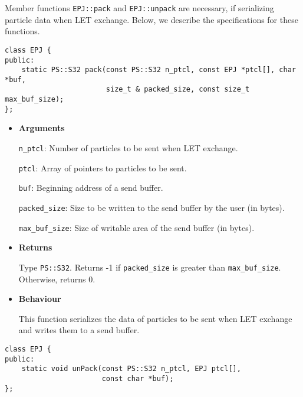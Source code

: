 \label{sec:EPJ:serialize}

Member functions \texttt{EPJ::pack} and \texttt{EPJ::unpack} are necessary, if serializing particle data when LET exchange. Below, we describe the specifications for these functions.



\begin{screen}
\begin{verbatim}
class EPJ {
public:
    static PS::S32 pack(const PS::S32 n_ptcl, const EPJ *ptcl[], char *buf, 
                        size_t & packed_size, const size_t max_buf_size);
};
\end{verbatim}
\end{screen}

\begin{itemize}

\item {\bf Arguments}

  \texttt{n\_ptcl}: Number of particles to be sent when LET exchange. 
  

  \texttt{ptcl}: Array of pointers to particles to be sent. 

  \texttt{buf}: Beginning address of a send buffer. 

  \texttt{packed\_size}: Size to be written to the send buffer by the user (in bytes). 

  \texttt{max\_buf\_size}: Size of writable area of the send buffer (in bytes).

\item {\bf Returns}

  Type \texttt{PS::S32}. Returns -1 if \texttt{packed\_size} is greater than \texttt{max\_buf\_size}. Otherwise, returns 0.
  
\item {\bf Behaviour}

  This function serializes the data of particles to be sent when LET exchange and writes them to a send buffer.

\end{itemize}



\begin{screen}
\begin{verbatim}
class EPJ {
public:
    static void unPack(const PS::S32 n_ptcl, EPJ ptcl[],
                       const char *buf);
};
\end{verbatim}
\end{screen}

